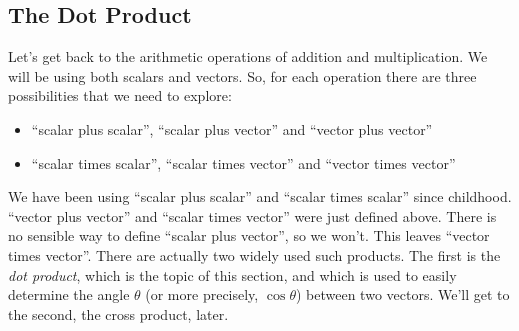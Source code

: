 \subsection{The Dot Product}\label{subsec dot product}
Let's get back to the arithmetic operations of addition and multiplication.
We will be using both scalars and vectors. So, for each operation there are 
three possibilities that we need to explore: 
\begin{itemize}\itemsep1pt \parskip0pt 
\item ``scalar plus scalar'', ``scalar plus vector'' and ``vector plus vector''
\item``scalar times scalar'', ``scalar times vector'' and 
         ``vector times vector''
\end{itemize}
We have been using ``scalar plus scalar'' and ``scalar times scalar''
since childhood. ``vector plus vector'' and ``scalar times vector''
were just defined above. There is no sensible way to define ``scalar plus vector'', so we won't. This leaves ``vector times vector''. 
There are actually two widely used such products.
The first is the \emph{dot product}, which is the topic of this section,
and which is used to easily determine the angle $\theta$ (or more precisely,
$\cos\theta$) between two vectors.
We'll get to the second, the cross product, later. 

